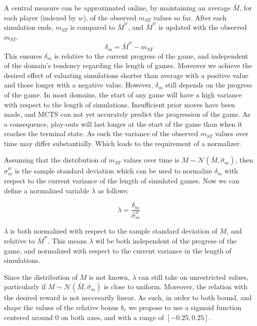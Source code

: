 \documentclass{ecai2010}
\begin{document}
A central measure can be approximated online, by maintaining an average $\bar{M}$, for each player (indexed by $w$), of the observed $m_{ST}$ values so far. After each simulation ends, $m_{ST}$ is compared to $\bar{M}^w$, and $\bar{M}^w$ is updated with the observed $m_{ST}$.
\begin{equation}
\delta_m = \bar{M}^w - m_{ST}
\end{equation}
 This ensures $\delta_m$ is relative to the current progress of the game, and independent of the domain's tendency regarding the length of games. Moreover we achieve the desired effect of valuating simulations shorter than average with a positive value and those longer with a negative value. However, $\delta_m$ still depends on the progress of the game. In most domains, the start of any game will have a high variance with respect to the length of simulations. Insufficient prior moves have been made, and MCTS can not yet accurately predict the progression of the game. As a consequence, play-outs will last longer at the start of the game than when it reaches the terminal state. As such the variance of the observed $m_{ST}$ values over time may differ substantially. Which leads to the requirement of a normalizer.

Assuming that the distribution of $m_{ST}$ values over time is $M \sim \mathcal{N}(\bar{M}, \hat{\sigma}_m)$, then $\hat{\sigma}^w_m$ is the sample standard deviation which can be used to normalize $\delta_m$ with respect to the current variance of the length of simulated games. Now we can define a normalized variable $\lambda$ as follows:

\begin{equation}
\lambda = \frac{\delta_m}{\hat{\sigma}^w_m}
\end{equation}

$\lambda$ is both normalized with respect to the sample standard deviation of $M$, and relative to $\bar{M}^w$. This means $\lambda$ wil be both independent of the progress of the game, and normalized with respect to the current variance in the length of simulations.

Since the distribution of $M$ is not known, $\lambda$ can still take on unrestricted values, particularly if $M \sim \mathcal{N}(\bar{M}, \hat{\sigma}_m)$ is close to uniform. Moreover, the relation with the desired reward is not neccesarily linear. As such, in order to both bound, and shape the values of the relative bonus $b_r$ we propose to use a sigmoid function centered around $0$ on both axes, and with a range of $[-0.25, 0.25]$.
\end{document}
